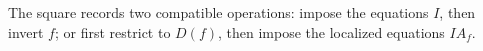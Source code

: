 \begin{center}
\end{center}
\noindent The square records two compatible operations: impose the equations $I$, then invert $f$; or first restrict to $D(f)$, then impose the localized equations $IA_f$.